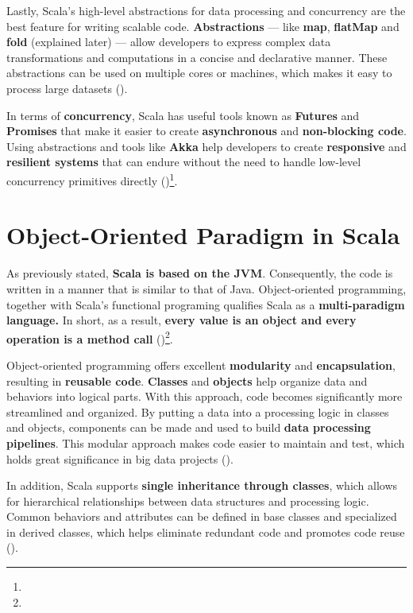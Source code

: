 Lastly, Scala's high-level abstractions for data processing and concurrency are the best feature for writing scalable code. \textbf{Abstractions} — like \textbf{map}, \textbf{flatMap} and \textbf{fold} (explained later) — allow developers to express complex data transformations and computations in a concise and declarative manner. These abstractions can be used on multiple cores or machines, which makes it easy to process large datasets (\cite{odersky.etal_2021})\footnotemark[2].

In terms of \textbf{concurrency}, Scala has useful tools known as \textbf{Futures} and \textbf{Promises} that make it easier to create \textbf{asynchronous} and \textbf{non-blocking code}. Using abstractions and tools like \textbf{Akka} help developers to create \textbf{responsive} and \textbf{resilient systems} that can endure without the  need to handle low-level concurrency primitives directly (\cite{odersky.etal_2021})\footnote[2]{}.

\section{Object-Oriented Paradigm in Scala}

As previously stated, \textbf{Scala is based on the JVM}. Consequently, the code is written in a manner that is similar to that of Java. Object-oriented programming, together with Scala’s functional programing qualifies Scala as a \textbf{multi-paradigm language.} In short, as a result, \textbf{every value is an object and every operation is a method call} (\cite{joshuad.suerethScalaDepth2012})\footnote[4]{}.

Object-oriented programming offers excellent \textbf{modularity} and \textbf{encapsulation}, resulting in \textbf{reusable code}. \textbf{Classes} and \textbf{objects} help organize data and behaviors into logical parts. With this approach, code becomes significantly more streamlined and organized. By putting a data into a processing logic in classes and objects, components can be made and used to build \textbf{data processing pipelines}. This modular approach makes code easier to maintain and test, which holds great significance in big data projects (\cite{ghoshDSLsAction2011})\footnotemark[3].

In addition, Scala supports \textbf{single inheritance through classes}, which allows for hierarchical relationships between data structures and processing logic. Common behaviors and attributes can be defined in base classes and specialized in derived classes, which helps eliminate redundant code and promotes code reuse (\cite{ghoshDSLsAction2011})\footnotemark[3].

